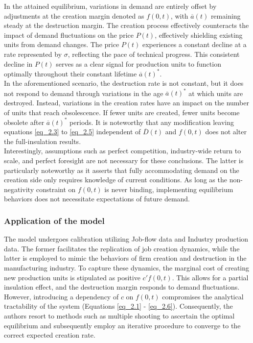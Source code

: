 \documentclass[12pt]{report}
\begin{document}
In the attained equilibrium, variations in demand are entirely offset by adjustments at the creation margin denoted as
\(f(0, t)\), with \(\overline{a}(t)\) remaining steady at the destruction margin. The creation process effectively
counteracts the impact of demand fluctuations on the price \(P(t)\), effectively shielding existing units from demand
changes. The price \(P(t)\) experiences a constant decline at a rate represented by \(\sigma\), reflecting the pace of
technical progress. This consistent decline in \(P(t)\) serves as a clear signal for production units to function
optimally throughout their constant lifetime \(\overline{a}(t)^*\). \\
In the aforementioned scenario, the destruction rate is not constant, but it does not respond to demand through
variations in the age \(\overline{a}(t)^*\) at which units are destroyed. Instead, variations in the creation rates have
an impact on the number of units that reach obsolescence. If fewer units are created, fewer units become obsolete after
\(\overline{a}(t)^*\) periods. It is noteworthy that any modification leaving equations \ref{eq_2.3} to \ref{eq_2.5}
independent of \(\overline{D}(t)\) and \(f(0,t)\) does not alter the full-insulation results. 
\\
Interestingly, assumptions such as perfect competition, industry-wide return to scale, and perfect foresight are not
necessary for these conclusions. The latter is particularly noteworthy as it asserts that fully accommodating demand on
the creation side only requires knowledge of current conditions. As long as the non-negativity constraint on \(f(0,t)\)
is never binding, implementing equilibrium behaviors does not necessitate expectations of future demand. 
\subsubsection{Application of the model}
The model undergoes calibration utilizing Job-flow data and Industry production data. The former facilitates the
replication of job creation dynamics, while the latter is employed to mimic the behaviors of firm creation and
destruction in the manufacturing industry. To capture these dynamics, the marginal cost of creating new production units
is stipulated as positive \(c'f(0,t)\). This allows for a partial insulation effect, and the destruction margin responds
to demand fluctuations. However, introducing a dependency of \(c\) on \(f(0,t)\) compromises the analytical tractability
of the system (Equations \ref{eq_2.1} - \ref{eq_2.6}). Consequently, the authors resort to methods such as multiple
shooting to ascertain the optimal equilibrium and subsequently employ an iterative procedure to converge to the correct
expected creation rate. 
\end{document}
